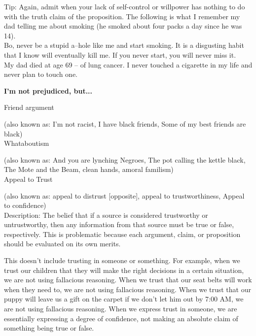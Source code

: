 \documentclass[a4paper,12pt,single,pdftex]{scrartcl}
\begin{document}
{    
      Tip: Again, admit when your lack of self-control or willpower has nothing to do with the truth claim of the proposition.  The following is what I remember my dad telling me about smoking (he smoked about four packs a day since he was 14).
    \\

    
      Bo, never be a stupid a--hole like me and start smoking.  It is a disgusting habit that I know will eventually kill me.  If you never start, you will never miss it.
    \\

    
      My dad died at age 69 -- of lung cancer.  I never touched a cigarette in my life and never plan to touch one.
    \\

  }
\par \textbf{I'm not prejudiced, but...}


Friend argument
    
      (also known as: I'm not racist, I have black friends, Some of my best friends are black)
    \\

  

Whataboutism
    
      (also known as: And you are lynching Negroes, The pot calling the kettle black, The Mote and the Beam, clean hands, amoral familism)
    \\

  

Appeal to Trust
    
      (also known as: appeal to distrust [opposite], appeal to trustworthiness, Appeal to confidence)
    \\

  
    Description: The belief that if a source is considered trustworthy or untrustworthy, then any information from that source must be true or false, respectively. This is problematic because each argument, claim, or proposition should be evaluated on its own merits.

    
      This doesn't include trusting in someone or something. For example, when we trust our children that they will make the right decisions in a certain situation, we are not using fallacious reasoning. When we trust that our seat belts will work when they need to, we are not using fallacious reasoning. When we trust that our puppy will leave us a gift on the carpet if we don't let him out by 7:00 AM, we are not using fallacious reasoning. When we express trust in someone, we are essentially expressing a degree of confidence, not making an absolute claim of something being true or false.
    \\
\end{document}
